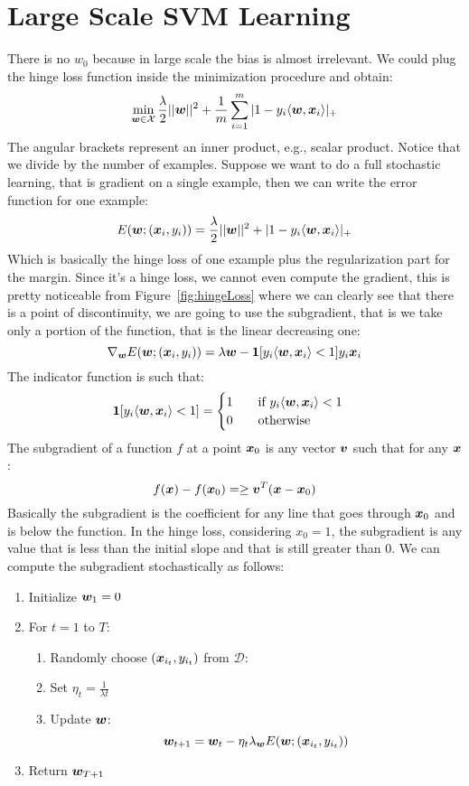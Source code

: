 \section{Large Scale SVM Learning}
There is no $w_0$ because in large scale the bias is almost irrelevant. \newline
We could plug the hinge loss function inside the minimization procedure and obtain:
\[\min\limits_{\bm{w}\in\mathcal{X}}\frac{\lambda}{2}\vert\vert\bm{w}\vert\vert^2+\frac{1}{m}\displaystyle\sum_{i=1}^m\vert 1-y_i\langle \bm{w},\bm{x}_i\rangle\vert_+\]
The angular brackets represent an inner product, e.g., scalar product. \newline
Notice that we divide by the number of examples. \newline
Suppose we want to do a full stochastic learning, that is gradient on a single example, then we can write the error function for one example:
\[E(\bm{w};(\bm{x}_i,y_i))=\frac{\lambda}{2}\vert\vert\bm{w}\vert\vert^2+\vert1-y_i\langle\bm{w},\bm{x}_i\rangle\vert_+\]
Which is basically the hinge loss of one example plus the regularization part for the margin. \newline
Since it's a hinge loss, we cannot even compute the gradient, this is pretty noticeable from Figure~\ref{fig:hingeLoss} where we can clearly see that there is a point of discontinuity, we are going to use the subgradient, that is we take only a portion of the function, that is the linear decreasing one:
\[\nabla_{\bm{w}}E(\bm{w};(\bm{x}_i,y_i))=\lambda\bm{w}-\mathbf{1}[y_i\langle\bm{w},\bm{x}_i\rangle<1]y_i\bm{x}_i\]
The indicator function is such that:
\[\mathbf{1}[y_i\langle\bm{w},\bm{x}_i\rangle<1]=
  \begin{cases}
    1\qquad\text{if }y_i\langle\bm{w},\bm{x}_i\rangle<1\\
    0\qquad\text{otherwise}
  \end{cases}
\]
The subgradient of a function $f$ at a point $\bm{x}_0$ is any vector $\bm{v}$ such that for any $\bm{x}$:
\[f(\bm{x})-f(\bm{x}_0)=\geq\bm{v}^T(\bm{x}-\bm{x}_0)\]
Basically the subgradient is the coefficient for any line that goes through $\bm{x}_0$ and is below the function. In the hinge loss, considering $x_0=1$, the subgradient is any value that is less than the initial slope and that is still greater than 0. 
We can compute the subgradient stochastically as follows:
\begin{enumerate}
  \item Initialize $\bm{w}_1=0$
  \item For $t=1$ to $T$:
    \begin{enumerate}
      \item Randomly choose $(\bm{x}_{i_t}, y_{i_t})$ from $\mathcal{D}$:
      \item Set $\eta_t=\frac{1}{\lambda t}$
      \item Update $\bm{w}$:
        \[\bm{w}_{t+1}=\bm{w}_t-\eta_t\lambda_{\bm{w}}E(\bm{w};(\bm{x}_{i_t},y_{i_t}))\]
    \end{enumerate}
  \item Return $\bm{w}_{T+1}$
\end{enumerate}
